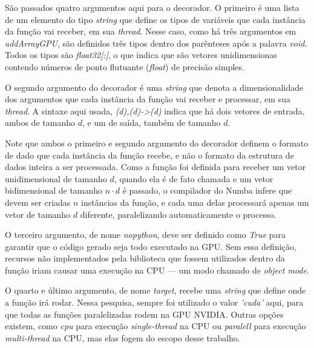 \documentclass[12pt,
openright, 
oneside, %
a4paper,    %
brazil]{facom-ufu-abntex2}
\begin{document}
São passados quatro argumentos aqui para o decorador. O primeiro é uma lista de um elemento do tipo \textit{string} que define os tipos de variáveis que cada instância da função vai receber, em sua \textit{thread}. Nesse caso, como há três argumentos em \textit{addArrayGPU}, são definidos três tipos dentro dos parênteses após a palavra \textit{void}. Todos os tipos são \textit{float32[:]}, o que indica que são vetores unidimensionas contendo números de ponto flutuante (\textit{float}) de precisão simples.

O segundo argumento do decorador é uma \textit{string} que denota a dimensionalidade dos argumentos que cada instância da função vai receber e processar, em sua \textit{thread}. A sintaxe aqui usada, \textit{(d),(d)->(d)} indica que há dois vetores de entrada, ambos de tamanho $d$, e um de saída, também de tamanho $d$.

Note que ambos o primeiro e segundo argumento do decorador definem o formato de dado que cada instância da função recebe, e não o formato da estrutura de dados inteira a ser processada. Como a função foi definida para receber um vetor unidimensional de tamanho $d$, quando ela é de fato chamada e um vetor bidimensional de tamanho $n \cdot d$ é passado, o compilador do Numba infere que devem ser criadas $n$ instâncias da função, e cada uma delas processará apenas um vetor de tamanho $d$ diferente, paralelizando automaticamente o processo.

O terceiro argumento, de nome \textit{nopython}, deve ser definido como \textit{True} para garantir que o código gerado seja todo executado na GPU. Sem essa definição, recursos não implementados pela biblioteca que fossem utilizados dentro da função iriam causar uma execução na CPU --- um modo chamado de \textit{object mode}.

O quarto e último argumento, de nome \textit{target}, recebe uma \textit{string} que define onde a função irá rodar. Nessa pesquisa, sempre foi utilizado o valor \textit{'cuda'} aqui, para que todas as funções paralelizadas rodem na GPU NVIDIA. Outras opções existem, como \textit{cpu} para execução \textit{single-thread} na CPU ou \textit{paralell} para execução \textit{multi-thread} na CPU, mas elas fogem do escopo desse trabalho.

% 

% 
% 
% 
% 
\end{document}

